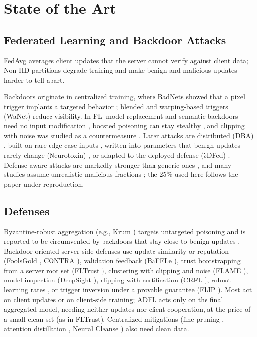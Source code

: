 \documentclass[conference]{IEEEtran}
\begin{document}
\section{State of the Art}
\subsection{Federated Learning and Backdoor Attacks}
FedAvg \cite{mcmahan2017fedavg} averages client updates that the server cannot verify against client data; Non-IID partitions degrade training \cite{hsu2019noniid} and make benign and malicious updates harder to tell apart.

Backdoors originate in centralized training, where BadNets showed that a pixel trigger implants a targeted behavior \cite{gu2017badnets}; blended \cite{chen2017blended} and warping-based triggers (WaNet) \cite{nguyen2021wanet} reduce visibility. In FL, model replacement and semantic backdoors need no input modification \cite{bagdasaryan2020backdoor}, boosted poisoning can stay stealthy \cite{bhagoji2019adversarial}, and clipping with noise was studied as a countermeasure \cite{sun2019backdoor}. Later attacks are distributed (DBA) \cite{xie2020dba}, built on rare edge-case inputs \cite{wang2020tails}, written into parameters that benign updates rarely change (Neurotoxin) \cite{zhang2022neurotoxin}, or adapted to the deployed defense (3DFed) \cite{li2023_3dfed}. Defense-aware attacks are markedly stronger than generic ones \cite{shejwalkar2021manipulating}, and many studies assume unrealistic malicious fractions \cite{shejwalkar2022back}; the 25\% used here follows the paper under reproduction.

\subsection{Defenses}
Byzantine-robust aggregation (e.g., Krum \cite{blanchard2017krum}) targets untargeted poisoning and is reported to be circumvented by backdoors that stay close to benign updates \cite{bagdasaryan2020backdoor,wang2020tails}. Backdoor-oriented server-side defenses use update similarity or reputation (FoolsGold \cite{fung2020foolsgold}, CONTRA \cite{awan2021contra}), validation feedback (BaFFLe \cite{andreina2021baffle}), trust bootstrapping from a server root set (FLTrust \cite{cao2021fltrust}), clustering with clipping and noise (FLAME \cite{nguyen2022flame}), model inspection (DeepSight \cite{rieger2022deepsight}), clipping with certification (CRFL \cite{xie2021crfl}), robust learning rates \cite{ozdayi2021rlr}, or trigger inversion under a provable guarantee (FLIP \cite{zhang2023flip}). Most act on client updates or on client-side training; ADFL acts only on the final aggregated model, needing neither updates nor client cooperation, at the price of a small clean set (as in FLTrust). Centralized mitigations (fine-pruning \cite{liu2018fineprune}, attention distillation \cite{li2021nad}, Neural Cleanse \cite{wang2019neuralcleanse}) also need clean data.
\end{document}
